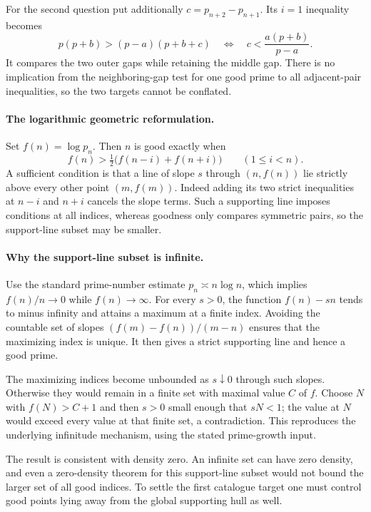 \documentclass[11pt,a4paper]{article}
\begin{document}
For the second question put additionally
$c=p_{n+2}-p_{n+1}$. Its $i=1$ inequality becomes
\[
 p(p+b)>(p-a)(p+b+c)
 \quad\Longleftrightarrow\quad
                      c<\frac{a(p+b)}{p-a}.
\]
It compares the two outer gaps while retaining the middle gap. There
is no implication from the neighboring-gap test for one good prime to
all adjacent-pair inequalities, so the two targets cannot be conflated.

\paragraph{The logarithmic geometric reformulation.}
Set $f(n)=\log p_n$. Then $n$ is good exactly when
\[
 f(n)>\tfrac12\bigl(f(n-i)+f(n+i)\bigr)\qquad(1\le i<n).
\]
A sufficient condition is that a line of slope $s$ through
$(n,f(n))$ lie strictly above every other point $(m,f(m))$.
Indeed adding its two strict inequalities at $n-i$ and $n+i$
cancels the slope terms. Such a supporting line imposes conditions at
all indices, whereas goodness only compares symmetric pairs, so the
support-line subset may be smaller.

\paragraph{Why the support-line subset is infinite.}
Use the standard prime-number estimate $p_n\asymp n\log n$, which
implies $f(n)/n\to0$ while $f(n)\to\infty$. For every $s>0$,
the function $f(n)-sn$ tends to minus infinity and attains a maximum
at a finite index. Avoiding the countable set of slopes
$(f(m)-f(n))/(m-n)$ ensures that the maximizing index is unique.
It then gives a strict supporting line and hence a good prime.

The maximizing indices become unbounded as $s\downarrow0$ through
such slopes. Otherwise they would remain in a finite set with maximal
value $C$ of $f$. Choose $N$ with $f(N)>C+1$ and then $s>0$
small enough that $sN<1$; the value at $N$ would exceed every value
at that finite set, a contradiction. This reproduces the underlying
infinitude mechanism, using the stated prime-growth input.

The result is consistent with density zero. An infinite set can have
zero density, and even a zero-density theorem for this support-line
subset would not bound the larger set of all good indices. To settle
the first catalogue target one must control good points lying away
from the global supporting hull as well.
\end{document}
